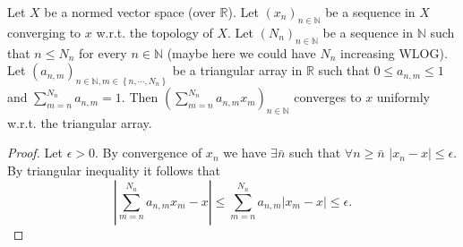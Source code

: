 \begin{lemma}\label{lem:convex_of_converg_seq_is_converg}
  Let $X$ be a normed vector space (over $\mathbb{R}$).
  Let $(x_n)_{n\in\mathbb{N}}$ be a sequence in $X$ converging to $x$ w.r.t. the topology of $X$.
  Let $(N_n)_{n\in\mathbb{N}}$ be a sequence in $\mathbb{N}$ such that $n\leq N_n$ for every $n\in\mathbb{N}$ (maybe here we could have $N_n$ increasing WLOG).
  Let $(a_{n,m})_{n\in\mathbb{N},m\in\left\lbrace n,\cdots,N_n\right\rbrace}$ be a triangular array in $\mathbb{R}$ such that $0\leq a_{n,m}\leq 1$ and $\sum_{m=n}^{N_n}a_{n,m}=1$.
  Then $(\sum_{m=n}^{N_n}a_{n,m}x_m)_{n\in\mathbb{N}}$ converges to $x$ uniformly w.r.t. the triangular array.
\end{lemma}
\begin{proof}
  Let $\epsilon>0$.
  By convergence of $x_n$ we have $\exists \bar{n}$ such that $\forall n\geq\bar{n}$ $|x_n-x|\leq \epsilon$.
  By triangular inequality it follows that
  $$
  |\sum_{m=n}^{N_n}a_{n,m}x_m - x|\leq \sum_{m=n}^{N_n}a_{n,m}|x_m-x|\leq\epsilon.
  $$
\end{proof}

